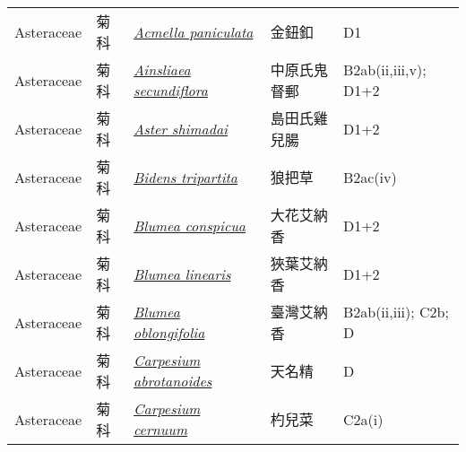 {\begin{longtable}{L{2.5cm}L{2cm}L{5cm}L{2.5cm}L{3cm}}
    Asteraceae & 菊科 & \href{http://www.theplantlist.org/tpl1.1/search?q=Acmella+paniculata}{\textit{Acmella paniculata} } & 金鈕釦 & D1    \\
    Asteraceae & 菊科 & \href{http://www.theplantlist.org/tpl1.1/search?q=Ainsliaea+secundiflora}{\textit{Ainsliaea secundiflora} } & 中原氏鬼督郵 & B2ab(ii,iii,v); D1+2    \\
    Asteraceae & 菊科 & \href{http://www.theplantlist.org/tpl1.1/search?q=Aster+shimadai}{\textit{Aster shimadai} } & 島田氏雞兒腸 & D1+2    \\
    Asteraceae & 菊科 & \href{http://www.theplantlist.org/tpl1.1/search?q=Bidens+tripartita}{\textit{Bidens tripartita} } & 狼把草 & B2ac(iv)    \\
    Asteraceae & 菊科 & \href{http://www.theplantlist.org/tpl1.1/search?q=Blumea+conspicua}{\textit{Blumea conspicua} } & 大花艾納香 & D1+2    \\
    Asteraceae & 菊科 & \href{http://www.theplantlist.org/tpl1.1/search?q=Blumea+linearis}{\textit{Blumea linearis} } & 狹葉艾納香 & D1+2    \\
    Asteraceae & 菊科 & \href{http://www.theplantlist.org/tpl1.1/search?q=Blumea+oblongifolia}{\textit{Blumea oblongifolia} } & 臺灣艾納香 & B2ab(ii,iii); C2b; D    \\
    Asteraceae & 菊科 & \href{http://www.theplantlist.org/tpl1.1/search?q=Carpesium+abrotanoides}{\textit{Carpesium abrotanoides} } & 天名精 & D    \\
    Asteraceae & 菊科 & \href{http://www.theplantlist.org/tpl1.1/search?q=Carpesium+cernuum}{\textit{Carpesium cernuum} } & 杓兒菜 & C2a(i)    \\

\end{longtable}}
